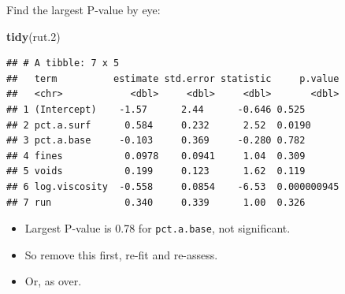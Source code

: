 \documentclass[ignorenonframetext,]{beamer}
\newenvironment{Shaded}{\begin{snugshade}}{\end{snugshade}}
\newcommand{\FloatTok}[1]{\textcolor[rgb]{0.00,0.00,0.81}{#1}}
\newcommand{\KeywordTok}[1]{\textcolor[rgb]{0.13,0.29,0.53}{\textbf{#1}}}
\newcommand{\NormalTok}[1]{#1}
\providecommand{\tightlist}{%
  \setlength{\itemsep}{0pt}\setlength{\parskip}{0pt}}
\begin{document}
\begin{frame}[fragile]{Find the largest P-value by eye:}
\protect\hypertarget{find-the-largest-p-value-by-eye}{}

\begin{Shaded}
\begin{Highlighting}[]
\KeywordTok{tidy}\NormalTok{(rut}\FloatTok{.2}\NormalTok{)}
\end{Highlighting}
\end{Shaded}

\begin{verbatim}
## # A tibble: 7 x 5
##   term          estimate std.error statistic     p.value
##   <chr>            <dbl>     <dbl>     <dbl>       <dbl>
## 1 (Intercept)    -1.57      2.44      -0.646 0.525      
## 2 pct.a.surf      0.584     0.232      2.52  0.0190     
## 3 pct.a.base     -0.103     0.369     -0.280 0.782      
## 4 fines           0.0978    0.0941     1.04  0.309      
## 5 voids           0.199     0.123      1.62  0.119      
## 6 log.viscosity  -0.558     0.0854    -6.53  0.000000945
## 7 run             0.340     0.339      1.00  0.326
\end{verbatim}

\begin{itemize}
\tightlist
\item
  Largest P-value is 0.78 for \texttt{pct.a.base}, not significant.
\item
  So remove this first, re-fit and re-assess.
\item
  Or, as over.
\end{itemize}

\end{frame}
\end{document}
